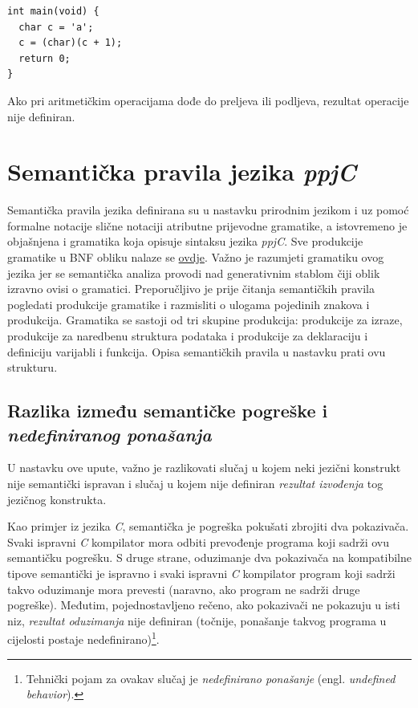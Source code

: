 \documentclass[times, 12pt, utf8]{book}
\begin{document}
\begin{lstlisting}[caption={Ispravljen program iz ispisa \ref{lst:primjer_operatori_int}.},label=lst:primjer_operatori_int_ispravljen]
int main(void) {
  char c = 'a';
  c = (char)(c + 1);
  return 0;
}
\end{lstlisting}

Ako pri aritmetičkim operacijama dođe do preljeva ili podljeva, rezultat operacije nije definiran.

\section{Semantička pravila jezika \emph{ppjC}}\label{sec:semanticka_pravila}
Semantička pravila jezika definirana su u nastavku prirodnim jezikom i uz pomoć formalne notacije slične notaciji atributne prijevodne gramatike, a istovremeno je objašnjena i gramatika koja opisuje sintaksu jezika \emph{ppjC}.
Sve produkcije gramatike u BNF obliku nalaze se \href{https://github.com/fer-ppj/ppj-labosi/raw/master/res/lab3/bnf.txt}{ovdje}.
Važno je razumjeti gramatiku ovog jezika jer se semantička analiza provodi nad generativnim stablom čiji oblik izravno ovisi o gramatici.
Preporučljivo je prije čitanja semantičkih pravila pogledati produkcije gramatike i razmisliti o ulogama pojedinih znakova i produkcija.
Gramatika se sastoji od tri skupine produkcija: produkcije za izraze, produkcije za naredbenu struktura podataka i produkcije za deklaraciju i definiciju varijabli i funkcija.
Opisa semantičkih pravila u nastavku prati ovu strukturu.

\subsection{Razlika između semantičke pogreške i \emph{nedefiniranog ponašanja}}\label{sec:UB}
U nastavku ove upute, važno je razlikovati slučaj u kojem neki jezični konstrukt nije semantički ispravan i slučaj u kojem nije definiran \emph{rezultat izvođenja} tog jezičnog konstrukta. 

Kao primjer iz jezika \emph{C}, semantička je pogreška pokušati zbrojiti dva pokazivača.
Svaki ispravni \emph{C} kompilator mora odbiti prevođenje programa koji sadrži ovu semantičku pogrešku.
S druge strane, oduzimanje dva pokazivača na kompatibilne tipove semantički je ispravno i svaki ispravni \emph{C} kompilator program koji sadrži takvo oduzimanje mora prevesti (naravno, ako program ne sadrži druge pogreške).
Međutim, pojednostavljeno rečeno, ako pokazivači ne pokazuju u isti niz, \emph{rezultat oduzimanja} nije definiran (točnije, ponašanje takvog programa u cijelosti postaje nedefinirano)\footnote{Tehnički pojam za ovakav slučaj je \emph{nedefinirano ponašanje} (engl. \emph{undefined behavior}).}.
\end{document}
